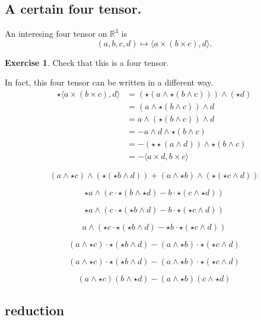 \documentclass[12pt]{article}
\theoremstyle{definition}
\newtheorem*{exercise}{Exercise}
\newcommand{\R}{\mathbb{R}}
\begin{document}
\subsection*{A certain four tensor.}

An interesing four tensor on $\R^3$ is 
$$
\left( a, b, c, d \right) \mapsto \langle a \times (b \times c), d \rangle.
$$
\begin{exercise}
Check that this is a four tensor.
\end{exercise}
In fact, this four tensor can be written in a different way.
\begin{align*}
\star \langle a \times (b \times c), d \rangle
&= \left( \star \left( a \wedge \star \left( b \wedge c \right) \right) \right) \wedge \left( \star d \right) \\
&= \left( a \wedge \star \left( b \wedge c \right) \right)\wedge d \\
&= a \wedge \left( \star \left( b \wedge c \right) \right) \wedge d \\
&= - a \wedge d \wedge \star \left( b \wedge c \right) \\
&= - \left( \star \star \left ( a \wedge d \right) \right) \wedge \star \left( b \wedge c \right) \\
&= - \langle a \times d, b \times c \rangle
\end{align*}

$$
(a \wedge \star c) \wedge (\star (\star b \wedge d)) 
+
(a \wedge \star b) \wedge (\star (\star c \wedge d)) 
$$


$$
\star a \wedge \left( c \cdot \star (b \wedge \star d) - b \cdot \star (c \wedge \star d) \right)
$$

$$
\star a \wedge \left( c \cdot \star (\star b \wedge d) - b \cdot \star (\star c \wedge d) \right)
$$


$$
a \wedge \left( \star c \cdot \star (\star b \wedge d) - \star b \cdot \star (\star c \wedge d) \right)
$$

$$
(a \wedge \star c) \cdot \star (\star b \wedge d) - (a \wedge \star b) \cdot \star (\star c \wedge d)
$$

$$
(a \wedge \star c) \cdot \star (\star b \wedge d) - (a \wedge \star b) \cdot \star (\star c \wedge d)
$$

$$
(a \wedge \star c) (b \wedge \star d) - (a \wedge \star b) (c \wedge \star d)
$$

\subsection*{reduction}
\end{document}
